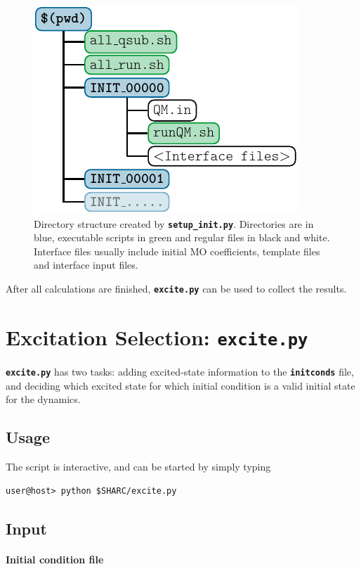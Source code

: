 \documentclass[a4paper,11pt,DIV=15,openany,twoside=false]{scrbook}
\newcommand{\ttt}[1]{\textbf{\texttt{#1}}}
\begin{document}
\begin{figure}
  \centering
  \includegraphics[scale=1]{img/dirs_init/dirs_init.pdf}
  \caption{Directory structure created by \ttt{setup\_init.py}. Directories are in blue, executable scripts in green and regular files in black and white. Interface files usually include initial MO coefficients, template files and interface input files.}
  \label{fig:dirs_init}
\end{figure}

After all calculations are finished, \ttt{excite.py} can be used to collect the results.


\section{Excitation Selection: \ttt{excite.py}}\label{sec:excite.py}

\ttt{excite.py} has two tasks: adding excited-state information to the \ttt{initconds} file, and deciding which excited state for which initial condition is a valid initial state for the dynamics.


\subsection{Usage}

The script is interactive, and can be started by simply typing 
\begin{verbatim}
user@host> python $SHARC/excite.py
\end{verbatim}


\subsection{Input}

\paragraph{Initial condition file}
\end{document}
